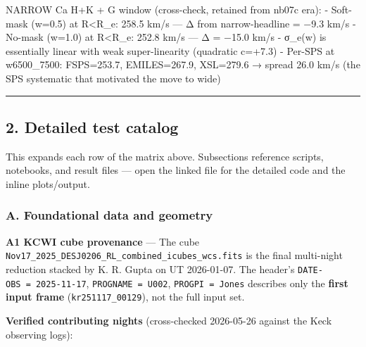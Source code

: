 \documentclass[
  10pt,
]{article}
\begin{document}
NARROW Ca H+K + G window (cross-check, retained from nb07c era): - Soft-mask (w=0.5) at R\textless R\_e: 258.5 km/s --- Δ from narrow-headline = −9.3 km/s - No-mask (w=1.0) at R\textless R\_e: 252.8
km/s --- Δ = −15.0 km/s - σ\_e(w) is essentially linear with weak super-linearity (quadratic c=+7.3) - Per-SPS at w6500\_7500: FSPS=253.7, EMILES=267.9, XSL=279.6 → spread 26.0 km/s (the SPS
systematic that motivated the move to wide)

\begin{center}\rule{0.5\linewidth}{0.5pt}\end{center}

\hypertarget{detailed-test-catalog}{%
\subsection{2. Detailed test catalog}\label{detailed-test-catalog}}

This expands each row of the matrix above. Subsections reference scripts, notebooks, and result files --- open the linked file for the detailed code and the inline plots/output.

\hypertarget{a.-foundational-data-and-geometry}{%
\subsubsection{A. Foundational data and geometry}\label{a.-foundational-data-and-geometry}}

\textbf{A1 KCWI cube provenance} --- The cube \texttt{Nov17\_2025\_DESJ0206\_RL\_combined\_icubes\_wcs.fits} is the final multi-night reduction stacked by K. R. Gupta on UT 2026-01-07. The header's
\texttt{DATE-OBS\ =\ 2025-11-17}, \texttt{PROGNAME\ =\ U002}, \texttt{PROGPI\ =\ Jones} describes only the \textbf{first input frame} (\texttt{kr251117\_00129}), not the full input set.

\textbf{Verified contributing nights} (cross-checked 2026-05-26 against the Keck observing logs):
\end{document}
